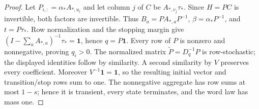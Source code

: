 \begin{proof}
Let $P_{i,:}=\alpha_*A_{*,u_i}$ and let column $j$ of $C$ be
$A_{*,v_j}\tau_*$. Since $H=PC$ is invertible, both factors are
invertible. Thus $B_a=PA_{*,a}P^{-1}$, $\beta=\alpha_*P^{-1}$,
and $t=P\tau_*$. Row normalization and the stopping margin give
$(I-\sum_aA_{*,a})^{-1}\tau_*=\mathbf1$, hence $q=P\mathbf1$.
Every row of $P$ is nonzero and nonnegative, proving $q_i>0$.
The normalized matrix $\widetilde P=D_q^{-1}P$ is row-stochastic;
the displayed identities follow by similarity. A second similarity
by $V$ preserves every coefficient. Moreover $V^{-1}\mathbf1=\mathbf1$,
so the resulting initial vector and transition/stop rows sum to one.
The nonnegative aggregate has row sums at most $1-s$; hence it is
transient, every state terminates, and the word law has mass one.
\end{proof}
